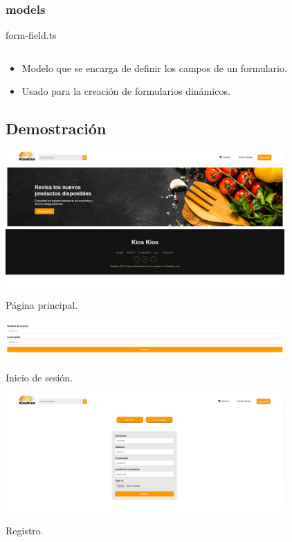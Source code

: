 \documentclass{article}
\newenvironment{block}{\captionsetup{type=listing}}{}
\begin{document}
\subsubsection{models}
\begin{block}
	\caption{form-field.ts}
	\inputminted{TypeScript}{kioskios_web/src/app/models/form-field.ts}
	\begin{itemize}
		\item Modelo que se encarga de definir los campos de un formulario.
		\item Usado para la creación de formularios dinámicos.
	\end{itemize}
\end{block}
\pagebreak


\subsection{Demostración}
\begin{block}
	\centering
	\includegraphics[width=0.8\textwidth]{img/E1.png}
	\caption{Página principal.}
	\includegraphics[width=0.8\textwidth]{img/E2.png}
	\caption{Inicio de sesión.}
	\includegraphics[width=0.8\textwidth]{img/E3.png}
	\caption{Registro.}
\end{block}
\pagebreak
\end{document}
